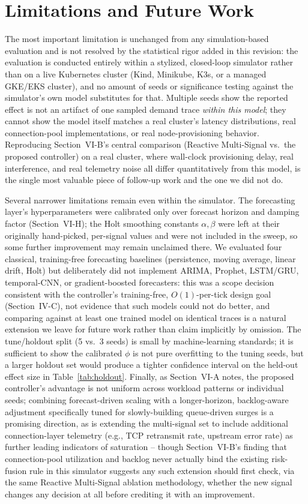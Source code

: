 \documentclass[conference]{IEEEtran}
\begin{document}
\section{Limitations and Future Work}

The most important limitation is unchanged from any simulation-based evaluation and is not resolved by
the statistical rigor added in this revision: the evaluation is conducted entirely within a stylized,
closed-loop simulator rather than on a live Kubernetes cluster (Kind, Minikube, K3s, or a managed
GKE/EKS cluster), and no amount of seeds or significance testing against the simulator's own model
substitutes for that. Multiple seeds show the reported effect is not an artifact of one sampled demand
trace \emph{within this model}; they cannot show the model itself matches a real cluster's latency
distributions, real connection-pool implementations, or real node-provisioning behavior. Reproducing
Section~VI-B's central comparison (Reactive Multi-Signal vs.\ the proposed controller) on a real cluster,
where wall-clock provisioning delay, real interference, and real telemetry noise all differ quantitatively
from this model, is the single most valuable piece of follow-up work and the one we did not do.

Several narrower limitations remain even within the simulator. The forecasting layer's hyperparameters
were calibrated only over forecast horizon and damping factor (Section~VI-H); the Holt smoothing
constants $\alpha,\beta$ were left at their originally hand-picked, per-signal values and were not
included in the sweep, so some further improvement may remain unclaimed there. We evaluated four
classical, training-free forecasting baselines (persistence, moving average, linear drift, Holt) but
deliberately did not implement ARIMA, Prophet, LSTM/GRU, temporal-CNN, or gradient-boosted forecasters:
this was a scope decision consistent with the controller's training-free, $O(1)$-per-tick design goal
(Section~IV-C), not evidence that such models could not do better, and comparing against at least one
trained model on identical traces is a natural extension we leave for future work rather than claim
implicitly by omission. The tune/holdout split (5 vs.\ 3 seeds) is small by machine-learning standards;
it is sufficient to show the calibrated $\phi$ is not pure overfitting to the tuning seeds, but a larger
holdout set would produce a tighter confidence interval on the held-out effect size in
Table~\ref{tab:holdout}. Finally, as Section~VI-A notes, the proposed controller's advantage is not
uniform across workload patterns or individual seeds; combining forecast-driven scaling with a
longer-horizon, backlog-aware adjustment specifically tuned for slowly-building queue-driven surges is a
promising direction, as is extending the multi-signal set to include additional connection-layer
telemetry (e.g., TCP retransmit rate, upstream error rate) as further leading indicators of saturation
-- though Section~VI-B's finding that connection-pool utilization and backlog never actually bind the
existing risk-fusion rule in this simulator suggests any such extension should first check, via the same
Reactive Multi-Signal ablation methodology, whether the new signal changes any decision at all before
crediting it with an improvement.
\end{document}
